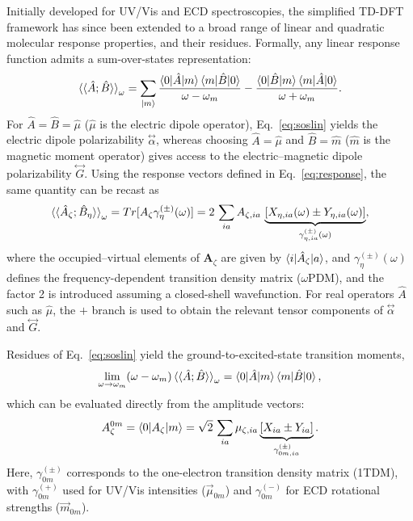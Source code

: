 \documentclass[%
 aip,
 amsmath,amssymb,
preprint,%
]{revtex4-2}
\newcommand\dstack[2]{\overset{#2}{#1}}
\begin{document}
Initially developed for UV/Vis and ECD spectroscopies, the simplified TD-DFT framework has since been extended to a broad range of linear and quadratic molecular response properties, and  their residues.\cite{dewergifossePerspectiveSimplifiedQuantum2021,loffelsenderSimplifiedQuantumChemistry2024}
Formally, any linear response function admits a sum-over-states representation:\cite{orrPerturbationTheoryNonlinear1971}
\begin{equation}
	\braket{\braket{\hat A; \hat B}}_{\omega} = \sum_{\ket{m}} \frac{\braket{0|\hat A|m}\braket{m|\hat B|0}}{\omega-\omega_m} - \frac{\braket{0|\hat B|m}\braket{m|\hat A|0}}{\omega+\omega_m}.
	\label{eq:soslin}
\end{equation}
For $\hat A = \hat B = \hat\mu$ ($\hat\mu$ is the electric dipole operator), Eq.~\eqref{eq:soslin} yields the electric dipole polarizability $\dstack{\alpha}{\leftrightarrow}$, whereas choosing $\hat A = \hat\mu$ and $\hat B = \hat m$ ($\hat m$ is the magnetic moment operator) gives access to the electric--magnetic dipole polarizability $\dstack{G}{\leftrightarrow}$.
Using the response vectors defined in Eq.~\eqref{eq:response}, the same quantity can be recast as
\begin{equation}
	\braket{\braket{\hat A_\zeta; \hat B_\eta}}_{\omega} = Tr[A_\zeta \gamma^{(\pm)}_\eta(\omega)] = 2\,\sum_{ia} A_{\zeta,ia}\,\underbrace{[X_{\eta, ia}(\omega) \pm Y_{\eta,ia}(\omega)]}_{\gamma^{(\pm)}_{\eta,ia}(\omega)}, 
	\label{eq:linresp}
\end{equation}
where the occupied--virtual elements of $\mathbf A_\zeta$ are given by $\braket{i|\hat A_\zeta|a}$, and $\gamma^{(\pm)}_{\eta}(\omega)$ defines the frequency-dependent transition density matrix ($\omega$PDM), and the factor 2 is introduced assuming a closed-shell wavefunction.  
For real operators $\hat A$ such as $\hat\mu$, the $+$ branch is used to obtain the relevant tensor components of $\dstack{\alpha}{\leftrightarrow}$ and $\dstack{G}{\leftrightarrow}$.

Residues of Eq.~\eqref{eq:soslin} yield the ground-to-excited-state transition moments,
\begin{equation*}
	\lim_{\omega\to\omega_m} (\omega-\omega_m)\braket{\braket{\hat A; \hat B}}_{\omega} = \braket{0|\hat A|m}\braket{m|\hat B|0},
\end{equation*}
which can be evaluated directly from the amplitude vectors:
\begin{equation}
	A_{\zeta}^{0m} = \braket{0|A_\zeta|m} = \sqrt{2}\,\sum_{ia} \mu_{\zeta,ia}\underbrace{[X_{ia} \pm Y_{ia}]}_{\gamma^{(\pm)}_{0m,ia}}.
\end{equation}
Here, $\gamma^{(\pm)}_{0m}$ corresponds to the one-electron transition density matrix (1TDM), with $\gamma^{(+)}_{0m}$ used for UV/Vis intensities ($\vec\mu_{0m}$) and $\gamma^{(-)}_{0m}$ for ECD rotational strengths ($\vec m_{0m}$).
\end{document}

